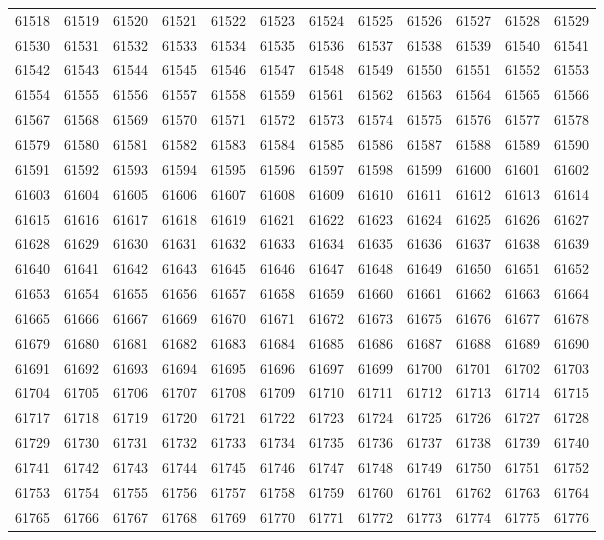 \begin{center}
\begin{longtable}{llllllllllll}
61518 &61519 &61520 &61521 &61522 &61523 &61524 &61525 &61526 &61527 &61528 &61529 \\
61530 &61531 &61532 &61533 &61534 &61535 &61536 &61537 &61538 &61539 &61540 &61541 \\
61542 &61543 &61544 &61545 &61546 &61547 &61548 &61549 &61550 &61551 &61552 &61553 \\
61554 &61555 &61556 &61557 &61558 &61559 &61561 &61562 &61563 &61564 &61565 &61566 \\
61567 &61568 &61569 &61570 &61571 &61572 &61573 &61574 &61575 &61576 &61577 &61578 \\
61579 &61580 &61581 &61582 &61583 &61584 &61585 &61586 &61587 &61588 &61589 &61590 \\
61591 &61592 &61593 &61594 &61595 &61596 &61597 &61598 &61599 &61600 &61601 &61602 \\
61603 &61604 &61605 &61606 &61607 &61608 &61609 &61610 &61611 &61612 &61613 &61614 \\
61615 &61616 &61617 &61618 &61619 &61621 &61622 &61623 &61624 &61625 &61626 &61627 \\
61628 &61629 &61630 &61631 &61632 &61633 &61634 &61635 &61636 &61637 &61638 &61639 \\
61640 &61641 &61642 &61643 &61645 &61646 &61647 &61648 &61649 &61650 &61651 &61652 \\
61653 &61654 &61655 &61656 &61657 &61658 &61659 &61660 &61661 &61662 &61663 &61664 \\
61665 &61666 &61667 &61669 &61670 &61671 &61672 &61673 &61675 &61676 &61677 &61678 \\
61679 &61680 &61681 &61682 &61683 &61684 &61685 &61686 &61687 &61688 &61689 &61690 \\
61691 &61692 &61693 &61694 &61695 &61696 &61697 &61699 &61700 &61701 &61702 &61703 \\
61704 &61705 &61706 &61707 &61708 &61709 &61710 &61711 &61712 &61713 &61714 &61715 \\
61717 &61718 &61719 &61720 &61721 &61722 &61723 &61724 &61725 &61726 &61727 &61728 \\
61729 &61730 &61731 &61732 &61733 &61734 &61735 &61736 &61737 &61738 &61739 &61740 \\
61741 &61742 &61743 &61744 &61745 &61746 &61747 &61748 &61749 &61750 &61751 &61752 \\
61753 &61754 &61755 &61756 &61757 &61758 &61759 &61760 &61761 &61762 &61763 &61764 \\
61765 &61766 &61767 &61768 &61769 &61770 &61771 &61772 &61773 &61774 &61775 &61776 \\

\end{longtable}
\end{center}
